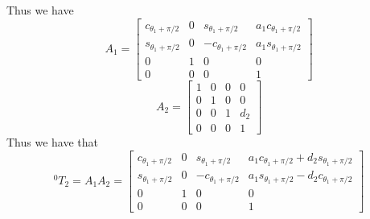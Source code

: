 \documentclass{../homework}
\begin{document}
\begin{problem}
\begin{parts}
     Thus we have
     \[
       A_1 = 
       \begin{bmatrix}
         c_{\theta_1 + \pi/2} & 0 & s_{\theta_1 + \pi/2} & a_1c_{\theta_1 + \pi/2} \\
         s_{\theta_1 + \pi/2} & 0 & -c_{\theta_1 + \pi/2} & a_1s_{\theta_1 + \pi/2} \\
         0 & 1 & 0 & 0 \\
         0 & 0 & 0 & 1
       \end{bmatrix}
     \]
     \[
       A_2 = 
       \begin{bmatrix}
         1 & 0 & 0 & 0 \\
         0 & 1 & 0 & 0 \\
         0 & 0 & 1 & d_2 \\
         0 & 0 & 0 & 1
       \end{bmatrix}
     \]
     Thus we have that 
     \[
       ^0T_2 = A_1A_2  =
       \begin{bmatrix}
         c_{\theta_1 + \pi/2} & 0 & s_{\theta_1 + \pi/2} & a_1c_{\theta_1 + \pi/2} + d_2s_{\theta_1+\pi/2} \\
         s_{\theta_1 + \pi/2} & 0 & -c_{\theta_1 + \pi/2} & a_1s_{\theta_1 + \pi/2} - d_2c_{\theta_1 + \pi/2}\\
         0 & 1 & 0 & 0 \\
         0 & 0 & 0 & 1
       \end{bmatrix}
     \]
     
  \end{parts}
\end{problem}
\end{document}
